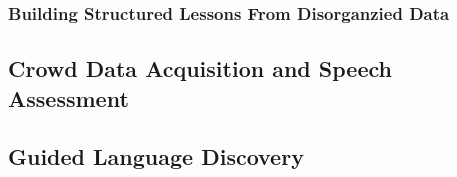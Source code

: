 \subsubsection{Building Structured Lessons From Disorganzied Data}



 







\subsection{Crowd Data Acquisition and Speech Assessment}
\subsection{Guided Language Discovery}